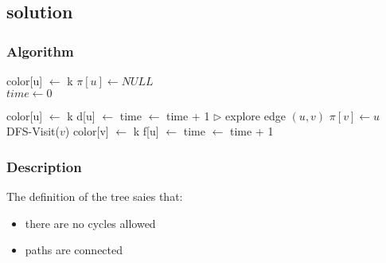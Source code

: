 \subsection{solution}

\subsubsection{Algorithm}
\begin{algorithmic}
        \State color[u] $\gets$ k
        \State $\pi[u] \gets NULL$
    \EndFor \\
    \State $time \gets 0$
\EndFunction
\end{algorithmic}

\smallskip

\begin{algorithmic}
    \State color[u] $\gets$ k
    \State d[u] $\gets$ time $\gets$ time + 1
      \State $\triangleright$ explore edge $(u,v)$
          \State $\pi[v] \gets u$
          \State DFS-Visit($v$)
      \EndIf
    \EndFor
    \State color[v] $\gets$  k
    \State f[u] $\gets$ time $\gets$ time + 1
\EndFunction
\end{algorithmic}

\subsubsection{Description}
The definition of the tree saies that:
\begin{itemize}
 \item there are no cycles allowed
 \item paths are connected
\end{itemize}

